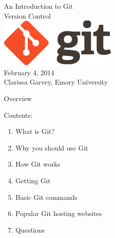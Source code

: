 \documentclass[xcolor=dvipsnames]{beamer}
\begin{document}
\begin{frame}
\begin{center}
\vspace{5mm}
{\huge An Introduction to Git\\ \vspace{1mm} Version Control}\\
\vspace{7mm}
\includegraphics[scale=.3]{gitlogo}\\
\vspace{8mm}
{\large February 4, 2014}\\
Clarissa Garvey, Emory University
\end{center}
\end{frame}

\begin{frame}{Overview}

{\LARGE Contents:}
\begin{enumerate}
\item What is Git?
\item Why you should use Git %
\item How Git works
\item Getting Git
\item Basic Git commands
\item Popular Git hosting websites
\item Questions
\end{enumerate}
\end{frame}
\end{document}
